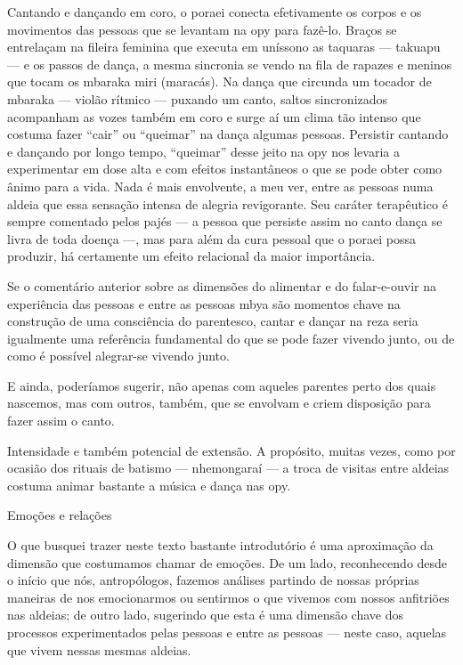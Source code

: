 \documentclass{article}
\begin{document}
Cantando e dan\c{c}ando em coro, o poraei conecta efetivamente os corpos
e os movimentos das pessoas que se levantam na opy para faz\^e-lo.
Bra\c{c}os se entrela\c{c}am na fileira feminina que executa em
un\'issono as taquaras --- takuapu --- e os passos de dan\c{c}a, a
mesma sincronia se vendo na fila de rapazes e meninos que tocam os
mbaraka miri (marac\'as). Na dan\c{c}a que circunda um tocador de
mbaraka --- viol\~ao r\'itmico --- puxando um canto, saltos
sincronizados acompanham as vozes tamb\'em em coro e surge a\'i um
clima t\~ao intenso que costuma fazer
{\textquotedblleft}cair{\textquotedblright} ou
{\textquotedblleft}queimar{\textquotedblright} na dan\c{c}a algumas
pessoas. Persistir cantando e dan\c{c}ando por longo tempo,
{\textquotedblleft}queimar{\textquotedblright} desse jeito na opy nos
levaria a experimentar em dose alta e com efeitos instant\^aneos o que
se pode obter como \^animo para a vida. Nada \'e mais envolvente, a meu
ver, entre as pessoas numa aldeia que essa sensa\c{c}\~ao intensa de
alegria revigorante. Seu car\'ater terap\^eutico \'e sempre comentado
pelos paj\'es --- a pessoa que persiste assim no canto dan\c{c}a se
livra de toda doen\c{c}a ---, mas para al\'em da cura pessoal que o
poraei possa produzir, h\'a certamente um efeito relacional da maior
import\^ancia.

Se o coment\'ario anterior sobre as dimens\~oes do alimentar e do
falar-e-ouvir na experi\^encia das pessoas e entre as pessoas mbya
s\~ao momentos chave na constru\c{c}\~ao de uma consci\^encia do
parentesco, cantar e dan\c{c}ar na reza seria igualmente uma
refer\^encia fundamental do que se pode fazer vivendo junto, ou de como
\'e poss\'ivel alegrar-se vivendo junto.

E ainda, poder\'iamos sugerir, n\~ao apenas com aqueles parentes perto
dos quais nascemos, mas com outros, tamb\'em, que se envolvam e criem
disposi\c{c}\~ao para fazer assim o canto.

Intensidade e tamb\'em potencial de extens\~ao. A prop\'osito, muitas
vezes, como por ocasi\~ao dos rituais de batismo --- nhemongara\'i ---
a troca de visitas entre aldeias costuma animar bastante a m\'usica e
dan\c{c}a nas opy.

Emo\c{c}\~oes e rela\c{c}\~oes

O que busquei trazer neste texto bastante introdut\'orio \'e uma
aproxima\c{c}\~ao da dimens\~ao que costumamos chamar de emo\c{c}\~oes.
De um lado, reconhecendo desde o in\'icio que n\'os, antrop\'ologos,
fazemos an\'alises partindo de nossas pr\'oprias maneiras de nos
emocionarmos ou sentirmos o que vivemos com nossos anfitri\~oes nas
aldeias; de outro lado, sugerindo que esta \'e uma dimens\~ao chave dos
processos experimentados pelas pessoas e entre as pessoas --- neste
caso, aquelas que vivem nessas mesmas aldeias.
\end{document}
